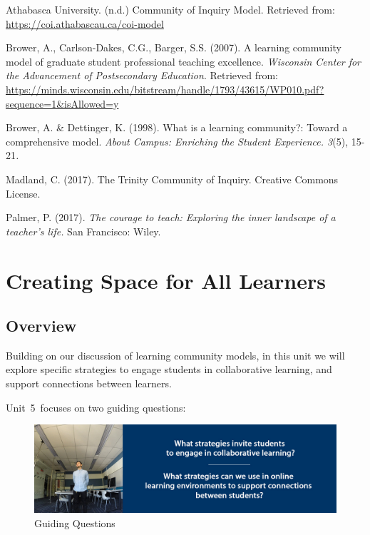 \documentclass[
]{book}
\begin{document}
Athabasca University. (n.d.) Community of Inquiry Model. Retrieved from: \url{https://coi.athabascau.ca/coi-model}

Brower, A., Carlson-Dakes, C.G., Barger, S.S. (2007). A learning community model of graduate student professional teaching excellence. \emph{Wisconsin Center for the Advancement of Postsecondary Education}. Retrieved from: \url{https://minds.wisconsin.edu/bitstream/handle/1793/43615/WP010.pdf?sequence=1\&isAllowed=y}

Brower, A. \& Dettinger, K. (1998). What is a learning community?: Toward a comprehensive model. \emph{About Campus: Enriching the Student Experience. 3}(5), 15-21\emph{. }

Madland, C. (2017). The Trinity Community of Inquiry. Creative Commons License.

Palmer, P. (2017). \emph{The courage to teach: Exploring the inner landscape of a teacher's life.} San Francisco: Wiley.

\hypertarget{creating-space-for-all-learners}{%
\chapter{Creating Space for All Learners}\label{creating-space-for-all-learners}}

\hypertarget{overview-4}{%
\section*{Overview}\label{overview-4}}

Building on our discussion of learning community models, in this unit we will explore specific strategies to engage students in collaborative learning, and support connections between learners.

Unit~5~focuses on two guiding questions:

\begin{figure}
\centering
\includegraphics{assets/unit5/LDRS664-BannerUnit5.jpg}
\caption{Guiding Questions}
\end{figure}
\end{document}
